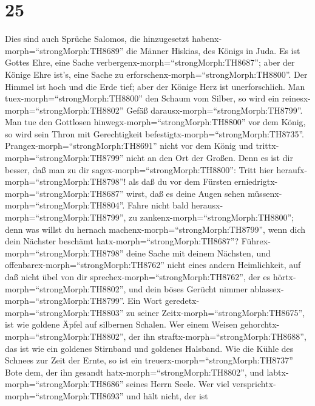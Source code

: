 \hypertarget{section-24}{%
\section{25}\label{section-24}}

 Dies sind auch Sprüche Salomos, die hinzugesetzt
habenx-morph=``strongMorph:TH8689'' die Männer Hiskias, des Königs in
Juda.  Es ist Gottes Ehre, eine Sache
verbergenx-morph=``strongMorph:TH8687''; aber der Könige Ehre ist's,
eine Sache zu erforschenx-morph=``strongMorph:TH8800''.  Der
Himmel ist hoch und die Erde tief; aber der Könige Herz ist
unerforschlich.  Man tuex-morph=``strongMorph:TH8800'' den
Schaum vom Silber, so wird ein reinesx-morph=``strongMorph:TH8802''
Gefäß darausx-morph=``strongMorph:TH8799''.  Man tue den
Gottlosen hinwegx-morph=``strongMorph:TH8800'' vor dem König, so wird
sein Thron mit Gerechtigkeit befestigtx-morph=``strongMorph:TH8735''.
 Prangex-morph=``strongMorph:TH8691'' nicht vor dem König
und trittx-morph=``strongMorph:TH8799'' nicht an den Ort der Großen.
 Denn es ist dir besser, daß man zu dir
sagex-morph=``strongMorph:TH8800'': Tritt hier
heraufx-morph=``strongMorph:TH8798''! als daß du vor dem Fürsten
erniedrigtx-morph=``strongMorph:TH8687'' wirst, daß es deine Augen sehen
müssenx-morph=``strongMorph:TH8804''.  Fahre nicht bald
herausx-morph=``strongMorph:TH8799'', zu
zankenx-morph=``strongMorph:TH8800''; denn was willst du hernach
machenx-morph=``strongMorph:TH8799'', wenn dich dein Nächster beschämt
hatx-morph=``strongMorph:TH8687''? 
Führex-morph=``strongMorph:TH8798'' deine Sache mit deinem Nächsten, und
offenbarex-morph=``strongMorph:TH8762'' nicht eines andern Heimlichkeit,
 auf daß nicht übel von dir
sprechex-morph=``strongMorph:TH8762'', der es
hörtx-morph=``strongMorph:TH8802'', und dein böses Gerücht nimmer
ablassex-morph=``strongMorph:TH8799''.  Ein Wort
geredetx-morph=``strongMorph:TH8803'' zu seiner
Zeitx-morph=``strongMorph:TH8675'', ist wie goldene Äpfel auf silbernen
Schalen.  Wer einem Weisen
gehorchtx-morph=``strongMorph:TH8802'', der ihn
straftx-morph=``strongMorph:TH8688'', das ist wie ein goldenes Stirnband
und goldenes Halsband.  Wie die Kühle des Schnees zur Zeit
der Ernte, so ist ein treuerx-morph=``strongMorph:TH8737'' Bote dem, der
ihn gesandt hatx-morph=``strongMorph:TH8802'', und
labtx-morph=``strongMorph:TH8686'' seines Herrn Seele.  Wer
viel versprichtx-morph=``strongMorph:TH8693'' und hält nicht, der ist
